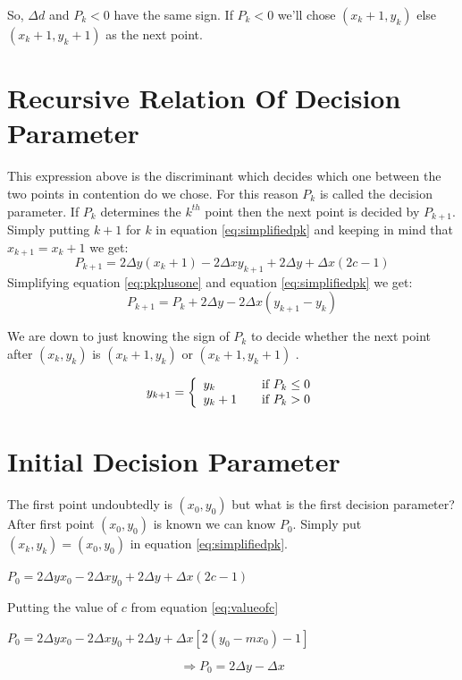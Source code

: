 \documentclass[a4paper,12pt,oneside]{book}
\begin{document}
So, $\Delta d$ and  $P_k<0$ have the same sign. If $P_k<0$  we'll chose $(x_k+1,y_k)$ else  $(x_k+1,y_k+1)$ as the next point. 

\section{Recursive Relation Of Decision Parameter}
This expression above is the discriminant which decides which one between the two points in contention do we chose. For this reason $P_k$ is called the decision parameter. If $P_k$ determines the $k^{th}$ point then the next point is decided by $P_{k+1}$. Simply putting $k+1$ for $k$ in equation \ref{eq:simplifiedpk}  and keeping in mind that $x_{k+1}=x_k+1$ we get:
\begin{equation} \label{eq:pkplusone}
	P_{k+1}=2\Delta y(x_k+1)-2\Delta xy_{k+1}+2\Delta y+\Delta x(2c-1)
\end{equation}
Simplifying equation \ref{eq:pkplusone} and equation \ref{eq:simplifiedpk} we get:
\begin{equation} \label{eq:recursivep}
	P_{k+1}=P_k+2\Delta y-2\Delta x(y_{k+1}-y_k)
\end{equation}

We are down to just knowing the sign of $P_k$ to decide whether the next point after $(x_k,y_k)$ is $(x_k+1,y_k)$ or $(x_k+1,y_k+1)$ .

\begin{center}
	\begin{equation}
		y_{k+1}= \left\{
					\begin{array}{l l}
						y_k & \quad \text{if $P_k \leq 0$}\\
						y_k+1 & \quad \text{if $P_k>0$}
					\end{array}
				\right.
	\end{equation}
\end{center}

\section{Initial Decision Parameter}

The first point undoubtedly is $(x_0,y_0)$   but what is the first decision parameter? After first point $(x_0,y_0)$ is known we can know $P_0$. Simply put $(x_k,y_k)=(x_0,y_0)$ in equation \ref{eq:simplifiedpk}.
\begin{center}
	$P_0=2\Delta yx_0-2\Delta xy_0+2\Delta y+\Delta x(2c-1)$
\end{center}
Putting the value of $c$ from equation \ref{eq:valueofc}
\begin{center}
	$P_0=2\Delta yx_0-2\Delta xy_0+2\Delta y+\Delta x[2(y_0-mx_0)-1]$	
\end{center}
\begin{equation} \label{eq:initialp}
	\Rightarrow P_0=2\Delta y-\Delta x
\end{equation}
  
\end{document}

